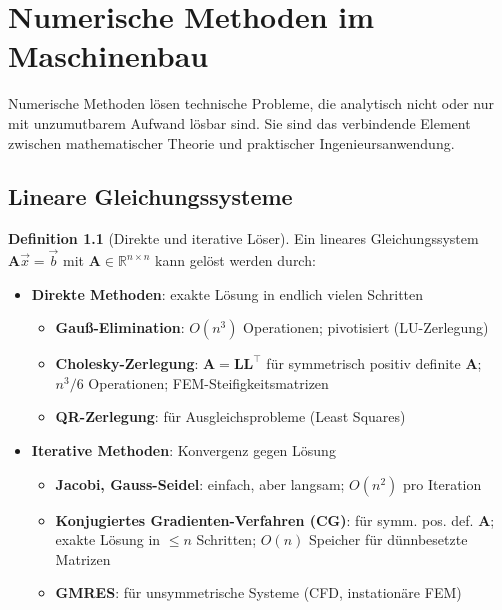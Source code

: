 ﻿\documentclass[a4paper,12pt]{report}
\theoremstyle{definition}
\newtheorem{definition}{Definition}
\begin{document}


\chapter{Numerische Methoden im Maschinenbau}

Numerische Methoden lösen technische Probleme, die analytisch nicht
oder nur mit unzumutbarem Aufwand lösbar sind. Sie sind das verbindende
Element zwischen mathematischer Theorie und praktischer Ingenieursanwendung.

\section{Lineare Gleichungssysteme}

\begin{definition}[Direkte und iterative Löser]
Ein lineares Gleichungssystem $\mathbf{A}\vec{x} = \vec{b}$ mit
$\mathbf{A} \in \mathbb{R}^{n\times n}$ kann gelöst werden durch:
\begin{itemize}
    \item[-] \textbf{Direkte Methoden}: exakte Lösung in endlich vielen Schritten
          \begin{itemize}
              \item[-] \textbf{Gauß-Elimination}: $O(n^3)$ Operationen; pivotisiert (LU-Zerlegung)
              \item[-] \textbf{Cholesky-Zerlegung}: $\mathbf{A} = \mathbf{L}\mathbf{L}^\top$
                    für symmetrisch positiv definite $\mathbf{A}$; $n^3/6$ Operationen;
                    FEM-Steifigkeitsmatrizen
              \item[-] \textbf{QR-Zerlegung}: für Ausgleichsprobleme (Least Squares)
          \end{itemize}
    \item[-] \textbf{Iterative Methoden}: Konvergenz gegen Lösung
          \begin{itemize}
              \item[-] \textbf{Jacobi, Gauss-Seidel}: einfach, aber langsam; $O(n^2)$ pro Iteration
              \item[-] \textbf{Konjugiertes Gradienten-Verfahren (CG)}: für symm. pos. def. $\mathbf{A}$;
                    exakte Lösung in $\le n$ Schritten; $O(n)$ Speicher für dünnbesetzte Matrizen
              \item[-] \textbf{GMRES}: für unsymmetrische Systeme (CFD, instationäre FEM)
          \end{itemize}
\end{itemize}
\end{definition}
\end{document}
